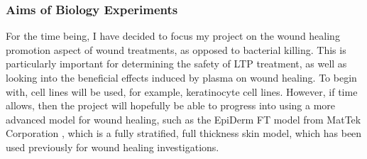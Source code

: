 \documentclass[11pt, oneside]{article}   	%
\begin{document}
%
%
%
%
%
%

\subsubsection{Aims of Biology Experiments}

For the time being, I have decided to focus my project on the wound healing promotion aspect of wound treatments, as opposed to bacterial killing.
This is particularly important for determining the safety of LTP treatment, as well as looking into the beneficial effects induced by plasma on wound healing.
To begin with, cell lines will be used, for example, keratinocyte cell lines. 
However, if time allows, then the project will hopefully be able to progress into using a more advanced model for wound healing, such as the EpiDerm FT model from MatTek Corporation \cite{MattekWebsite}, which is a fully stratified, full thickness skin model, which has been used previously for wound healing investigations.
\end{document}
